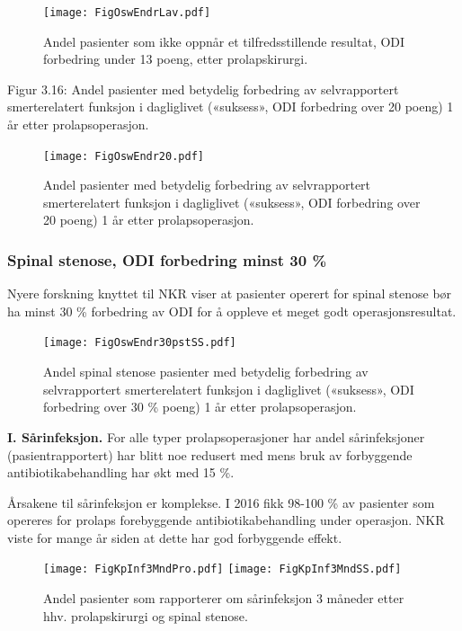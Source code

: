 \documentclass [norsk,a4paper,twoside]{article}\usepackage[]{graphicx}\usepackage[]{color}
\begin{document}
\begin{figure}[ht]
\centering \texttt{[image: FigOswEndrLav.pdf]}
\caption{\label{fig:OswEndrLav}   Andel pasienter som ikke oppnår et tilfredsstillende resultat, ODI
forbedring under 13 poeng, etter prolapskirurgi.}
\end{figure}



Figur 3.16: Andel pasienter med betydelig forbedring av selvrapportert
smerterelatert funksjon i dagliglivet («suksess», ODI forbedring over 20 poeng) 1 år
etter prolapsoperasjon.
\begin{figure}[ht]
\centering \texttt{[image: FigOswEndr20.pdf]}
\caption{\label{fig:OswEndr20}   Andel pasienter med betydelig forbedring av selvrapportert
smerterelatert funksjon i dagliglivet («suksess», ODI forbedring over 20 poeng) 1 år
etter prolapsoperasjon.}
\end{figure}

\subsubsection{Spinal stenose, ODI forbedring minst 30 \%}

Nyere forskning knyttet til NKR viser at pasienter operert for spinal stenose bør ha minst 30 \% forbedring av ODI for å oppleve et meget godt operasjonsresultat.

\begin{figure}[ht]
\centering \texttt{[image: FigOswEndr30pstSS.pdf]}
\caption{\label{fig:OswEndr30pstSS} Andel spinal stenose pasienter med betydelig forbedring av selvrapportert
smerterelatert funksjon i dagliglivet («suksess», ODI forbedring over 30 \% poeng) 1 år
etter prolapsoperasjon.}
\end{figure}




\textbf{I. Sårinfeksjon.}
For alle typer prolapsoperasjoner har
andel sårinfeksjoner (pasientrapportert) har blitt noe redusert med mens
bruk av forbyggende antibiotikabehandling har økt med 15 \%. 

Årsakene til sårinfeksjon er komplekse. I 2016 fikk 98-100 \% av pasienter som
opereres for prolaps forebyggende antibiotikabehandling under operasjon. NKR
viste for mange år siden at dette har god forbyggende effekt.

\begin{figure}[ht]
\centering \texttt{[image: FigKpInf3MndPro.pdf]}
\centering \texttt{[image: FigKpInf3MndSS.pdf]}
\caption{\label{fig:KpInf} Andel pasienter som rapporterer om sårinfeksjon 3 måneder etter
hhv. prolapskirurgi og spinal stenose.}
\end{figure}
\end{document}
